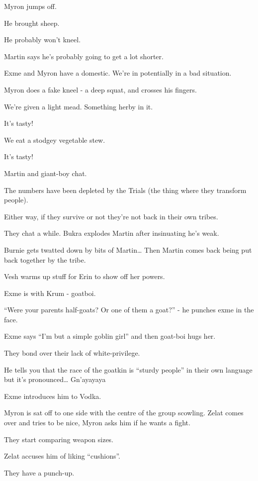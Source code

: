 Myron jumps off.\medskip

He brought sheep.\medskip

He probably won’t kneel.\medskip

Martin says he’s probably going to get a lot shorter.\medskip

Exme and Myron have a domestic. We’re in potentially in a bad situation.\medskip

Myron does a fake kneel - a deep squat, and crosses his fingers.\medskip

We’re given a light mead. Something herby in it.\medskip

It’s tasty!\medskip

We eat a stodgey vegetable stew.\medskip

It’s tasty!\medskip

Martin and giant-boy chat.\medskip

The numbers have been depleted by the Trials (the thing where they transform people).\medskip

Either way, if they survive or not they’re not back in their own tribes.\medskip

They chat a while. Bukra explodes Martin after insinuating he’s weak.\medskip

Burnie gets twatted down by bits of Martin… Then Martin comes back being put back together by the tribe.\medskip

Vesh warms up stuff for Erin to show off her powers.\medskip

Exme is with Krum - goatboi.\medskip

“Were your parents half-goats? Or one of them a goat?” - he punches exme in the face.\medskip

Exme says “I’m but a simple goblin girl” and then goat-boi hugs her.\medskip

They bond over their lack of white-privilege.\medskip

He tells you that the race of the goatkin is “sturdy people” in their own language but it’s pronounced… Gn’ayayaya\medskip

Exme introduces him to Vodka.\medskip

Myron is sat off to one side with the centre of the group scowling. Zelat comes over and tries to be nice, Myron asks him if he wants a fight.\medskip

They start comparing weapon sizes.\medskip

Zelat accuses him of liking “cushions”.\medskip

They have a punch-up.\medskip

\vspace*{5mm}
